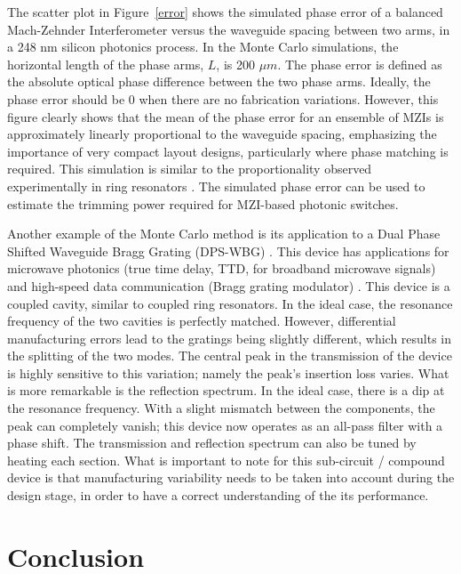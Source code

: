 \documentclass[journal]{spie}
\begin{document}
The scatter plot in Figure~\ref{error} shows the simulated phase error of a balanced Mach-Zehnder Interferometer versus the waveguide spacing between two arms, in a 248 nm silicon photonics process. In the Monte Carlo simulations, the horizontal length of the phase arms, $L$,  is 200 $\mu m$. The phase error is defined as the absolute optical phase difference between the two phase arms. Ideally, the phase error should be 0 when there are no fabrication variations. However, this figure clearly shows that the mean of the phase error for an ensemble of MZIs is approximately linearly proportional to the waveguide spacing, emphasizing the importance of very compact layout designs, particularly where phase matching is required.  This simulation is similar to the proportionality  observed experimentally in ring resonators \cite{lukas14:OFC}.  The simulated phase error can be used to estimate the trimming power required for MZI-based photonic switches. 

Another example of the Monte Carlo method is its application to a Dual Phase Shifted Waveguide Bragg Grating (DPS-WBG) \cite{burla2013integrated, bedard2016dual}.  This device has applications for microwave photonics (true time delay, TTD, for broadband microwave signals) \cite{burla2013integrated} and high-speed data communication (Bragg grating modulator) \cite{bedard2016dual}.  This device is a coupled cavity, similar to coupled ring resonators.  In the ideal case, the resonance frequency of the two cavities is perfectly matched.  However, differential manufacturing errors lead to the gratings being slightly different, which results in the splitting of the two modes.  The central peak in the transmission of the device is highly sensitive to this variation; namely the peak's insertion loss varies.  What is more remarkable is the reflection spectrum. In the ideal case, there is a dip at the resonance frequency.  With a slight mismatch between the components, the peak can completely vanish; this device now operates as an all-pass filter with a phase shift.  The transmission and reflection spectrum can also be tuned by heating each section.  What is important to note for this sub-circuit / compound device is that manufacturing variability needs to be taken into account during the design stage, in order to have a correct understanding of the its performance.



\section{Conclusion}\label{sec6}
\end{document}
